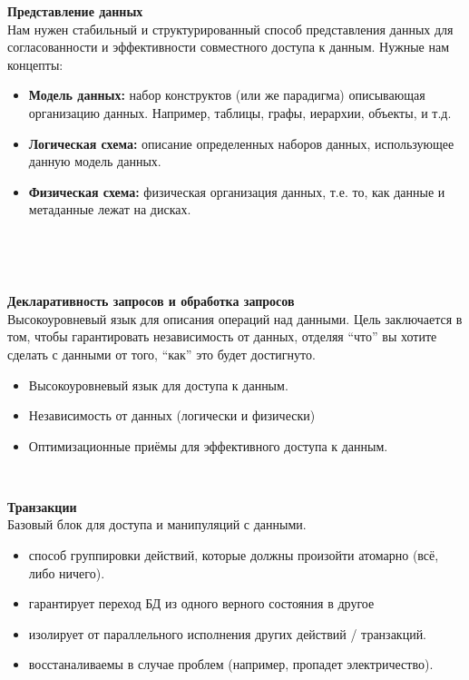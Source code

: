 \textbf{Представление данных} \\
Нам нужен стабильный и структурированный способ представления данных для согласованности и эффективности совместного доступа к данным. Нужные нам концепты: \\


\begin{itemize}
  \item \textbf{Модель данных:} набор конструктов (или же парадигма) описывающая организацию данных. Например, таблицы, графы, иерархии, объекты, и т.д.
  \item \textbf{Логическая схема:} описание определенных наборов данных, использующее данную модель данных.
  \item \textbf{Физическая схема:} физическая организация данных, т.е. то, как данные и метаданные лежат на дисках.
\end{itemize}
\

\

\textbf{Декларативность запросов и обработка запросов} \\
Высокоуровневый язык для описания операций над данными. Цель заключается в том, чтобы гарантировать независимость от данных, отделяя ``что'' вы хотите сделать с данными от того, ``как'' это будет достигнуто. \\

\begin{itemize}
  \item Высокоуровневый язык для доступа к данным.
  \item Независимость от данных (логически и физически)
  \item Оптимизационные приёмы для эффективного доступа к данным.
\end{itemize}
\

\textbf{Транзакции} \\
Базовый блок для доступа и манипуляций с данными. \\

\begin{itemize}
  \item способ группировки действий, которые должны произойти атомарно (всё, либо ничего).
  \item гарантирует переход БД из одного верного состояния в другое
  \item изолирует от параллельного исполнения других действий / транзакций.
  \item восстаналиваемы в случае проблем (например, пропадет электричество).
\end{itemize}
\

